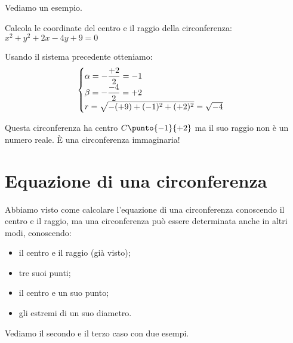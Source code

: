 Vediamo un esempio.

\begin{esempio}
Calcola le coordinate del centro e il raggio della circonferenza:
\(x^2 +y^2 +2x -4y +9 = 0\)

Usando il sistema precedente otteniamo:
\[\begin{cases}\alpha = -\dfrac{+2}{2} = -1\\ 
           \beta = -\dfrac{-4}{2} = +2 \\ 
           r = \sqrt{-(+9) +(-1)^2 + (+2)^2} = \sqrt{-4}\end{cases}\]
           
Questa circonferenza ha centro \(C\punto{-1}{+2}\) ma il suo raggio non è un 
numero reale. È una circonferenza immaginaria!
\end{esempio}

\section{Equazione di una circonferenza}
\label{sec:circ_equazione}

Abbiamo visto come calcolare l'equazione di una circonferenza conoscendo 
il centro e il raggio, ma una circonferenza può essere determinata anche in 
altri modi, conoscendo:

\begin{itemize} [noitemsep]
 \item il centro e il raggio (già visto);
 \item tre suoi punti;
 \item il centro e un suo punto;
 \item gli estremi di un suo diametro.
\end{itemize}

Vediamo il secondo e il terzo caso con due esempi.

